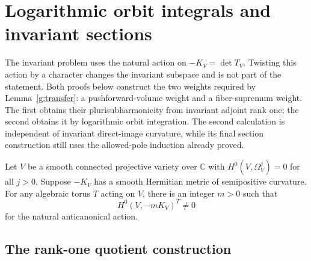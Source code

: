 \section{Logarithmic orbit integrals and invariant sections}
\label{g:orbits}\label{rb:torus}

The invariant problem uses the natural action on $-K_V=\det T_V$.
Twisting this action by a character changes the invariant subspace and
is not part of the statement.
Both proofs below construct the two weights required by
Lemma~\ref{g:transfer}: a pushforward-volume weight and a fiber-supremum
weight. The first obtains their plurisubharmonicity from invariant
adjoint rank one; the second obtains it by logarithmic orbit integration.
The second calculation is independent of invariant direct-image
curvature, while its final section construction still uses the
allowed-pole induction already proved.

\begin{theorem}\label{rb:invariant}
Let $V$ be a smooth connected projective variety over $\mathbb C$ with
$H^0(V,\Omega_V^j)=0$ for all $j>0$.  Suppose $-K_V$ has a smooth
Hermitian metric of semipositive curvature.  For any algebraic torus
$T$ acting on $V$, there is an integer $m>0$ such that
\[
                         H^0(V,-mK_V)^T\ne0
\]
for the natural anticanonical action.
\end{theorem}

\subsection{The rank-one quotient construction}

